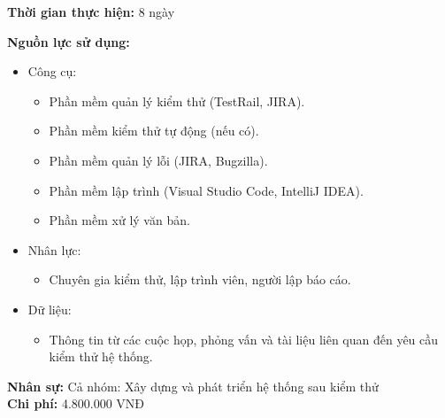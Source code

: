 {\begin{minipage}{\textwidth}
        \noindent\textbf{Thời gian thực hiện:} 8 ngày

        \noindent\textbf{Nguồn lực sử dụng:}
        \begin{itemize}
            \item Công cụ:
                  \begin{itemize}
                      \item Phần mềm quản lý kiểm thử (TestRail, JIRA).
                      \item Phần mềm kiểm thử tự động (nếu có).
                      \item Phần mềm quản lý lỗi (JIRA, Bugzilla).
                      \item Phần mềm lập trình (Visual Studio Code, IntelliJ IDEA).
                      \item Phần mềm xử lý văn bản.
                  \end{itemize}
            \item Nhân lực:
                  \begin{itemize}
                      \item Chuyên gia kiểm thử, lập trình viên, người lập báo cáo.
                  \end{itemize}
            \item Dữ liệu:
                  \begin{itemize}
                      \item Thông tin từ các cuộc họp, phỏng vấn và tài liệu liên quan đến yêu cầu kiểm thử hệ thống.
                  \end{itemize}
        \end{itemize}

        \noindent\textbf{Nhân sự:} Cả nhóm: Xây dựng và phát triển hệ thống sau kiểm thử \\
        \noindent\textbf{Chi phí:} 4.800.000 VNĐ \\

    \end{minipage} \\
}
\newpage
